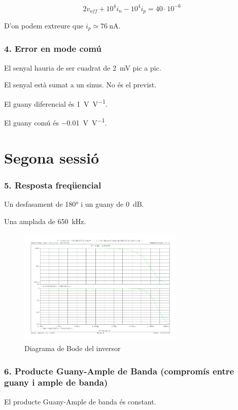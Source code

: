 \documentclass[catalan, a4paper, nobib]{tufte-handout}
\begin{document}
\begin{equation}
    2 v_{off} + 10^4 i_n - 10^4 i_p = 40 \cdot 10^{-6}
\end{equation}

D'on podem extreure que $i_p \simeq \qty{76}{\nano\ampere}$.

\section{4. Error en mode comú}
 El senyal hauria de ser cuadrat de \qty{2}{\milli\volt} pic a pic.

 El senyal està sumat a un sinus. No és el previst.

 El guany diferencial és \qty{1}{\volt\per\volt}.

 El guany comú és \qty{-0.01}{\volt\per\volt}.

\part{Segona sessió}
\section{5. Resposta freqüencial}
 Un desfasament de \ang{180} i un guany de \qty{0}{\deci\bel}.

 Una amplada de \qty{650}{\kilo\hertz}.

\begin{figure}[h]
    \begin{center}
        \includegraphics[width=300px]{s2/5_1.pdf}
    \end{center}
    \caption{Diagrama de Bode del inversor}
\end{figure}

\section{6. Producte Guany-Ample de Banda (compromís entre guany i ample de banda)}
 El producte Guany-Ample de banda és constant.
\end{document}
